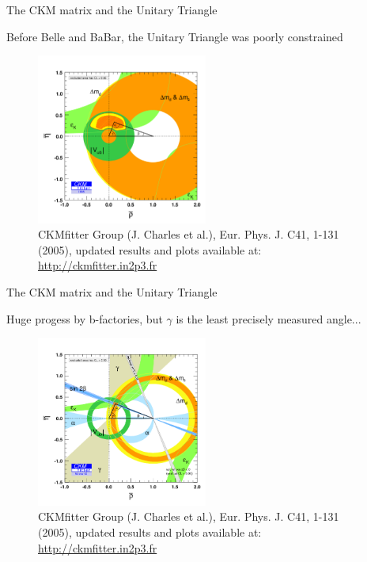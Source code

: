 \documentclass[dvipsnames]{beamer}
\begin{document}
\begin{frame}{The CKM matrix and the Unitary Triangle}
  \begin{center}
    Before Belle and BaBar, the Unitary Triangle was poorly constrained
  \end{center}
  \vspace{-0.2cm}
  \begin{figure}
    \includegraphics[width = 0.50\textwidth]{Plots/CKM_global_1995.png}
    \vspace{-0.3cm}
    \caption*{\centering\tiny CKMfitter Group (J. Charles et al.), Eur. Phys. J. C41, 1-131 (2005), updated results and plots available at: \href{http://ckmfitter.in2p3.fr}{http://ckmfitter.in2p3.fr}}
  \end{figure}
\end{frame}

\begin{frame}{The CKM matrix and the Unitary Triangle}
  \begin{center}
    Huge progess by b-factories, but $\gamma$ is the least precisely measured angle...
  \end{center}
  \vspace{-0.2cm}
  \begin{figure}
    \includegraphics[width = 0.50\textwidth]{Plots/CKM_global_2012.png}
    \vspace{-0.3cm}
    \caption*{\centering\tiny CKMfitter Group (J. Charles et al.), Eur. Phys. J. C41, 1-131 (2005), updated results and plots available at: \href{http://ckmfitter.in2p3.fr}{http://ckmfitter.in2p3.fr}}
  \end{figure}
\end{frame}
\end{document}
